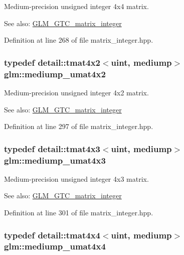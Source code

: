 Medium-precision unsigned integer 4x4 matrix. \begin{Desc}
\item[See also:]\hyperlink{group__gtc__matrix__integer}{GLM\_\-GTC\_\-matrix\_\-integer} \end{Desc}


Definition at line 268 of file matrix\_\-integer.hpp.\hypertarget{group__gtc__matrix__integer_g8ea45737e8bc9bfae2668968056b109f}{
\subsubsection[mediump\_\-umat4x2]{\setlength{\rightskip}{0pt plus 5cm}typedef detail::tmat4x2$<$uint, mediump$>$ {\bf glm::mediump\_\-umat4x2}}}
\label{group__gtc__matrix__integer_g8ea45737e8bc9bfae2668968056b109f}


Medium-precision unsigned integer 4x2 matrix. \begin{Desc}
\item[See also:]\hyperlink{group__gtc__matrix__integer}{GLM\_\-GTC\_\-matrix\_\-integer} \end{Desc}


Definition at line 297 of file matrix\_\-integer.hpp.\hypertarget{group__gtc__matrix__integer_gebe3b1b4b6030c096447e40fb00528f4}{
\subsubsection[mediump\_\-umat4x3]{\setlength{\rightskip}{0pt plus 5cm}typedef detail::tmat4x3$<$uint, mediump$>$ {\bf glm::mediump\_\-umat4x3}}}
\label{group__gtc__matrix__integer_gebe3b1b4b6030c096447e40fb00528f4}


Medium-precision unsigned integer 4x3 matrix. \begin{Desc}
\item[See also:]\hyperlink{group__gtc__matrix__integer}{GLM\_\-GTC\_\-matrix\_\-integer} \end{Desc}


Definition at line 301 of file matrix\_\-integer.hpp.\hypertarget{group__gtc__matrix__integer_g24b1c76fefa58f810e24cafe0ea6a6a0}{
\subsubsection[mediump\_\-umat4x4]{\setlength{\rightskip}{0pt plus 5cm}typedef detail::tmat4x4$<$uint, mediump$>$ {\bf glm::mediump\_\-umat4x4}}}
\label{group__gtc__matrix__integer_g24b1c76fefa58f810e24cafe0ea6a6a0}


